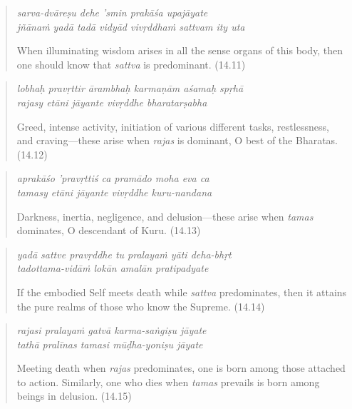 \documentclass[12pt, twoside, openright]{memoir}
\begin{document}
\par
\begin{verse}
\textit{sarva-dvāreṣu dehe ’smin prakāśa upajāyate} \\
\textit{jñānaṁ yadā tadā vidyād vivṛddhaṁ sattvam ity uta}

\noindent When illuminating wisdom arises in all the sense organs of this body, then one should know that \textit{sattva} is predominant. (14.11)
\end{verse}
\par



\par
\begin{verse}
\textit{lobhaḥ pravṛttir ārambhaḥ karmaṇām aśamaḥ spṛhā} \\
\textit{rajasy etāni jāyante vivṛddhe bharatarṣabha}

\noindent Greed, intense activity, initiation of various different tasks, restlessness, and craving---these arise when \textit{rajas} is dominant, O best of the Bharatas. (14.12)
\end{verse}
\par



\par
\begin{verse}
\textit{aprakāśo ’pravṛttiś ca pramādo moha eva ca} \\
\textit{tamasy etāni jāyante vivṛddhe kuru-nandana}

\noindent Darkness, inertia, negligence, and delusion---these arise when \textit{tamas} dominates, O descendant of Kuru. (14.13)
\end{verse}
\par



\par
\begin{verse}
\textit{yadā sattve pravṛddhe tu pralayaṁ yāti deha-bhṛt} \\
\textit{tadottama-vidāṁ lokān amalān pratipadyate}

\noindent If the embodied Self meets death while \textit{sattva} predominates, then it attains the pure realms of those who know the Supreme. (14.14)
\end{verse}
\par



\par
\begin{verse}
\textit{rajasi pralayaṁ gatvā karma-saṅgiṣu jāyate} \\
\textit{tathā pralīnas tamasi mūḍha-yoniṣu jāyate}

\noindent Meeting death when \textit{rajas} predominates, one is born among those attached to action. Similarly, one who dies when \textit{tamas} prevails is born among beings in delusion. (14.15)
\end{verse}
\par
\end{document}
